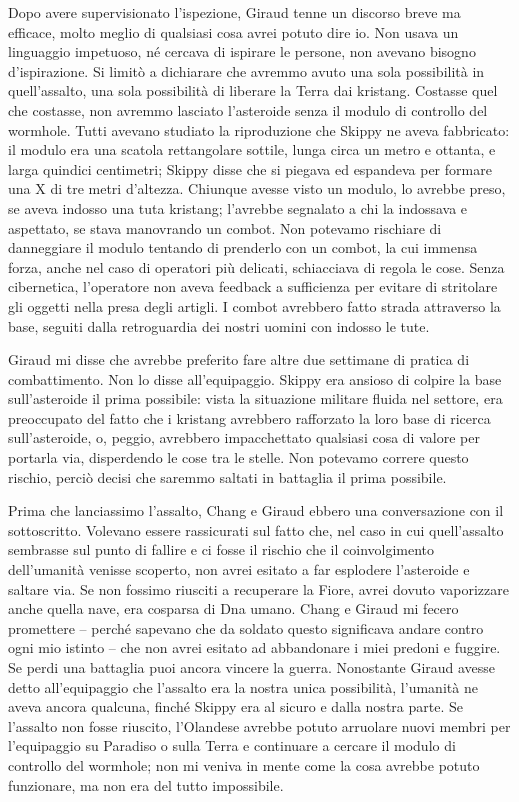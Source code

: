 Dopo avere supervisionato l'ispezione, Giraud tenne un discorso breve ma
efficace, molto meglio di qualsiasi cosa avrei potuto dire io. Non usava
un linguaggio impetuoso, né cercava di ispirare le persone, non avevano
bisogno d'ispirazione. Si limitò a dichiarare che avremmo avuto una sola
possibilità in quell'assalto, una sola possibilità di liberare la Terra
dai kristang. Costasse quel che costasse, non avremmo lasciato
l'asteroide senza il modulo di controllo del wormhole. Tutti avevano
studiato la riproduzione che Skippy ne aveva fabbricato: il modulo era
una scatola rettangolare sottile, lunga circa un metro e ottanta, e
larga quindici centimetri; Skippy disse che si piegava ed espandeva per
formare una X di tre metri d'altezza. Chiunque avesse visto un modulo,
lo avrebbe preso, se aveva indosso una tuta kristang; l'avrebbe
segnalato a chi la indossava e aspettato, se stava manovrando un combot.
Non potevamo rischiare di danneggiare il modulo tentando di prenderlo
con un combot, la cui immensa forza, anche nel caso di operatori più
delicati, schiacciava di regola le cose. Senza cibernetica, l'operatore
non aveva feedback a sufficienza per evitare di stritolare gli oggetti
nella presa degli artigli. I combot avrebbero fatto strada attraverso la
base, seguiti dalla retroguardia dei nostri uomini con indosso le tute.

Giraud mi disse che avrebbe preferito fare altre due settimane di
pratica di combattimento. Non lo disse all'equipaggio. Skippy era
ansioso di colpire la base sull'asteroide il prima possibile: vista la
situazione militare fluida nel settore, era preoccupato del fatto che i
kristang avrebbero rafforzato la loro base di ricerca sull'asteroide, o,
peggio, avrebbero impacchettato qualsiasi cosa di valore per portarla
via, disperdendo le cose tra le stelle. Non potevamo correre questo
rischio, perciò decisi che saremmo saltati in battaglia il prima
possibile.

Prima che lanciassimo l'assalto, Chang e Giraud ebbero una conversazione
con il sottoscritto. Volevano essere rassicurati sul fatto che, nel caso
in cui quell'assalto sembrasse sul punto di fallire e ci fosse il
rischio che il coinvolgimento dell'umanità venisse scoperto, non avrei
esitato a far esplodere l'asteroide e saltare via. Se non fossimo
riusciti a recuperare la Fiore, avrei dovuto vaporizzare anche quella
nave, era cosparsa di Dna umano. Chang e Giraud mi fecero promettere --
perché sapevano che da soldato questo significava andare contro ogni mio
istinto -- che non avrei esitato ad abbandonare i miei predoni e
fuggire. Se perdi una battaglia puoi ancora vincere la guerra.
Nonostante Giraud avesse detto all'equipaggio che l'assalto era la
nostra unica possibilità, l'umanità ne aveva ancora qualcuna, finché
Skippy era al sicuro e dalla nostra parte. Se l'assalto non fosse
riuscito, l'Olandese avrebbe potuto arruolare nuovi membri per
l'equipaggio su Paradiso o sulla Terra e continuare a cercare il modulo
di controllo del wormhole; non mi veniva in mente come la cosa avrebbe
potuto funzionare, ma non era del tutto impossibile.

